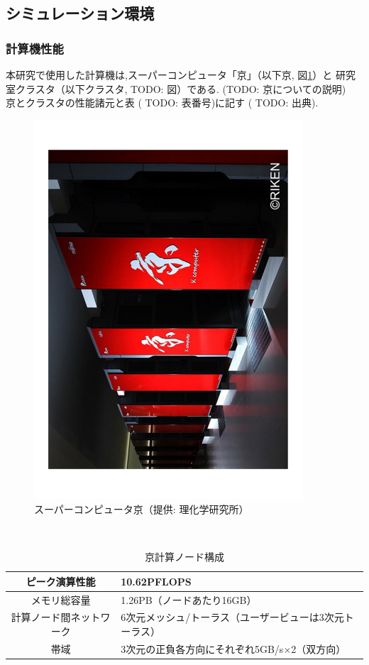 \subsection{シミュレーション環境}
\subsubsection{計算機性能}
本研究で使用した計算機は,スーパーコンピュータ「京」（以下京, 図\ref{fig:k}）と
研究室クラスタ（以下クラスタ, TODO: 図）である. (TODO: 京についての説明)\\
京とクラスタの性能諸元と表 ( TODO: 表番号)に記す ( TODO: 出典).\\

\begin{figure}[htb]
  \begin{center}
    \includegraphics[width=10.0cm, angle=-90]{./images/k}
    \caption{スーパーコンピュータ京（提供: 理化学研究所）}
    \label{fig:k}
  \end{center}
\end{figure}
~\\
\begin{table}[t]
  \begin{center}
    \begin{tabular}{|c|p{12cm}|}
      \hline
      ピーク演算性能 & 10.62PFLOPS \\ \hline
      メモリ総容量 & 1.26PB（ノードあたり16GB）\\ \hline
      計算ノード間ネットワーク & 6次元メッシュ/トーラス（ユーザービューは3次元トーラス）\\ \hline
      帯域 & 3次元の正負各方向にそれぞれ5GB/s×2（双方向）\\ \hline
    \end{tabular}
  \end{center}
  \caption {京計算ノード構成}
\end{table}
